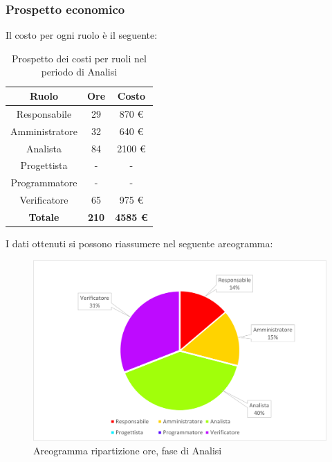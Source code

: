 \subsubsection{Prospetto economico}
Il costo per ogni ruolo è il seguente:
\begin{table}[H]
		\begin{center}
			\setlength{\aboverulesep}{0pt}
			\setlength{\belowrulesep}{0pt}
			\setlength{\extrarowheight}{.75ex}
			\begin{tabular}{ c c c }
				\rowcolor{AzzurroGruppo!30} 
				\textbf{Ruolo} & \textbf{Ore} & \textbf{Costo}  \\
				\toprule
				Responsabile & 29 & 870 \euro \\
				Amministratore & 32 & 640 \euro \\
				Analista & 84 & 2100 \euro \\
				Progettista & - & - \\
				Programmatore & - & - \\
				Verificatore & 65 & 975 \euro \\
				\textbf{Totale} & \textbf{210} & \textbf{4585 \euro} \\
				\bottomrule
			\end{tabular}
			\caption{ Prospetto dei costi per ruoli nel periodo di Analisi}
		\end{center}
\end{table}
I dati ottenuti si possono riassumere nel seguente areogramma:
\begin{figure}[H]
    \centering
    \includegraphics[scale = 0.5]{components/img/analisi-torta.png}
    \caption{ Areogramma ripartizione ore, fase di Analisi}
    \label{fig:Areogramma ripartizione ore, fase di Analisi}
\end{figure}
